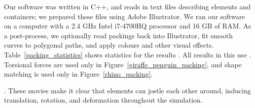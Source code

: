 Our software was written in C++, and reads in text files describing
elements and containers; we prepared these files using
Adobe Illustrator.  We ran
our software on a computer with a 2.4 GHz Intel i7-4700HQ processor
and 16 GB of RAM.  As a post-process, we optionally read packings
back into Illustrator, fit smooth curves to polygonal paths, and
apply colours and other visual effects.  Table~\ref{packing_statistics}
shows statistics for the results .  All results in this
 use .
Torsional forces are used only in Figure~\ref{giraffe_penguin_packing},
and shape matching is used only in Figure~\ref{rhino_packing}.

.  
These movies make it clear that elements can jostle each other
around, inducing translation, rotation, and deformation throughout the 
simulation.

